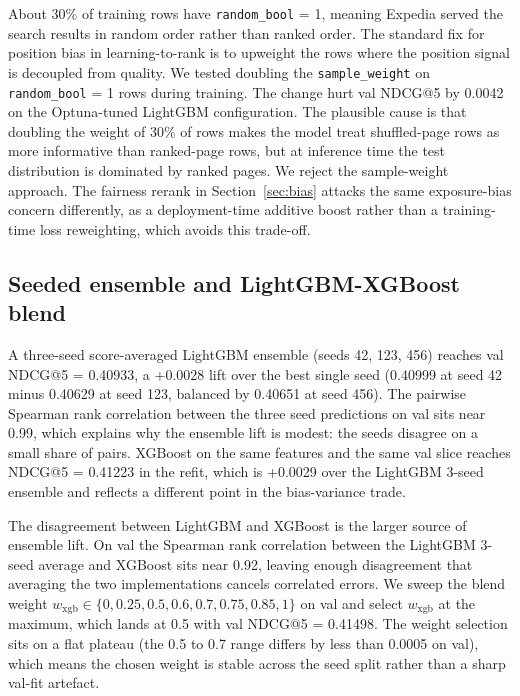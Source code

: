 \documentclass[runningheads]{llncs}
\begin{document}
About 30\% of training rows have \texttt{random\_bool} = 1, meaning Expedia served the search results in random order rather than ranked order. The standard fix for position bias in learning-to-rank is to upweight the rows where the position signal is decoupled from quality. We tested doubling the \texttt{sample\_weight} on \texttt{random\_bool} = 1 rows during training. The change hurt val NDCG@5 by 0.0042 on the Optuna-tuned LightGBM configuration. The plausible cause is that doubling the weight of 30\% of rows makes the model treat shuffled-page rows as more informative than ranked-page rows, but at inference time the test distribution is dominated by ranked pages. We reject the sample-weight approach. The fairness rerank in Section~\ref{sec:bias} attacks the same exposure-bias concern differently, as a deployment-time additive boost rather than a training-time loss reweighting, which avoids this trade-off.

\subsection{Seeded ensemble and LightGBM-XGBoost blend}\label{subsec:ensemble}

A three-seed score-averaged LightGBM ensemble (seeds 42, 123, 456) reaches val NDCG@5 = 0.40933, a +0.0028 lift over the best single seed (0.40999 at seed 42 minus 0.40629 at seed 123, balanced by 0.40651 at seed 456). The pairwise Spearman rank correlation between the three seed predictions on val sits near 0.99, which explains why the ensemble lift is modest: the seeds disagree on a small share of pairs. XGBoost on the same features and the same val slice reaches NDCG@5 = 0.41223 in the refit, which is +0.0029 over the LightGBM 3-seed ensemble and reflects a different point in the bias-variance trade.

The disagreement between LightGBM and XGBoost is the larger source of ensemble lift. On val the Spearman rank correlation between the LightGBM 3-seed average and XGBoost sits near 0.92, leaving enough disagreement that averaging the two implementations cancels correlated errors. We sweep the blend weight $w_{\text{xgb}} \in \{0, 0.25, 0.5, 0.6, 0.7, 0.75, 0.85, 1\}$ on val and select $w_{\text{xgb}}$ at the maximum, which lands at 0.5 with val NDCG@5 = 0.41498. The weight selection sits on a flat plateau (the 0.5 to 0.7 range differs by less than 0.0005 on val), which means the chosen weight is stable across the seed split rather than a sharp val-fit artefact.
\end{document}
